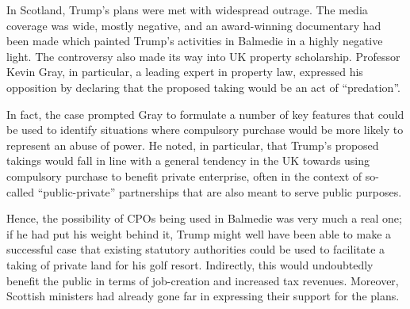 In Scotland, Trump's plans were met with widespread outrage. The media coverage was wide, mostly negative, and an award-winning documentary had been made which painted Trump's activities in Balmedie in a highly negative light. The controversy also made its way into UK property scholarship. Professor Kevin Gray, in particular, a leading expert in property law, expressed his opposition by declaring that the proposed taking would be an act of ``predation''. 

In fact, the case prompted Gray to formulate a number of key features that could be used to identify situations where compulsory purchase would be more likely to represent an abuse of power. He noted, in particular, that Trump's proposed takings would fall in line with a general tendency in the UK towards using compulsory purchase to benefit private enterprise, often in the context of so-called ``public-private'' partnerships that are also meant to serve public purposes.

Hence, the possibility of CPOs being used in Balmedie was very much a real one; if he had put his weight behind it, Trump might well have been able to make a successful case that existing statutory authorities could be used to facilitate a taking of private land for his golf resort. Indirectly, this would undoubtedly benefit the public in terms of job-creation and increased tax revenues. Moreover, Scottish ministers had already gone far in expressing their support for the plans.

